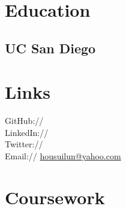 \documentclass[]{deedy-resume-openfont}
\begin{document}
%
%
\lastupdated

%
%



%
%

\begin{minipage}[t]{0.33\textwidth} 


\section{Education} 

\subsection{UC San Diego}
\sectionsep


\section{Links} 
GitHub:// \href{https://github.com/jonwho}{} \\
LinkedIn://  \href{https://www.linkedin.com/in/jonwho}{} \\
Twitter://  \href{https://twitter.com/lj080805}{} \\
Email:// \href{mailto:housuilun@yahoo.com}{housuilun@yahoo.com}
\sectionsep


\section{Coursework}

\end{minipage}
\end{document}
